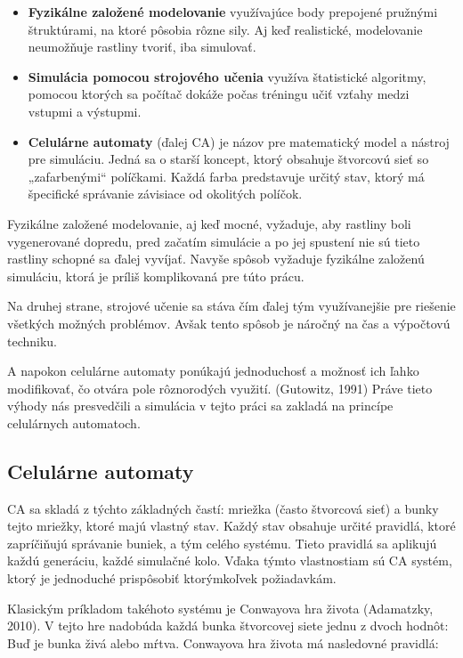 \documentclass[12pt]{article}
\begin{document}
\begin{itemize}
	\item \textbf{Fyzikálne založené modelovanie} využívajúce body prepojené
	      pružnými štruktúrami, na ktoré pôsobia rôzne sily. Aj keď realistické,
	      modelovanie neumožňuje rastliny tvoriť, iba simulovať.
	\item \textbf{Simulácia pomocou strojového učenia}
	      využíva štatistické
	      algoritmy, pomocou ktorých sa počítač dokáže počas tréningu učiť vzťahy medzi
	      vstupmi a výstupmi.
	\item \textbf{Celulárne automaty} (ďalej CA)
	      je názov pre matematický model a nástroj pre simuláciu. Jedná sa
	      o starší koncept, ktorý obsahuje štvorcovú sieť so „zafarbenými“
	      políčkami. Každá farba predstavuje určitý stav, ktorý má špecifické správanie
	      závisiace od okolitých políčok.
\end{itemize}

Fyzikálne založené modelovanie, aj keď mocné, vyžaduje, aby rastliny boli
vygenerované dopredu, pred začatím simulácie a po jej spustení nie sú tieto
rastliny schopné sa ďalej vyvíjať. Navyše spôsob vyžaduje fyzikálne založenú
simuláciu, ktorá je príliš komplikovaná pre túto prácu.

Na druhej strane, strojové učenie sa stáva čím ďalej tým využívanejšie pre
riešenie všetkých možných problémov. Avšak tento spôsob je náročný na čas
a výpočtovú techniku.

A napokon celulárne automaty ponúkajú jednoduchosť a možnosť ich ľahko
modifikovať, čo otvára pole rôznorodých využití. (Gutowitz, 1991)
Práve tieto výhody nás presvedčili a simulácia
v tejto práci sa zakladá na princípe celulárnych automatoch.

\subsection{Celulárne automaty}

CA sa skladá z týchto základných častí: mriežka (často štvorcová sieť)
a bunky tejto mriežky, ktoré majú vlastný stav. Každý stav obsahuje
určité pravidlá, ktoré zapríčiňujú správanie buniek, a tým celého systému.
Tieto pravidlá sa aplikujú každú generáciu, každé simulačné kolo.
Vďaka týmto vlastnostiam sú CA systém, ktorý je jednoduché prispôsobiť ktorýmkoľvek
požiadavkám.

Klasickým príkladom takéhoto systému je Conwayova hra života (Adamatzky, 2010).
V tejto hre nadobúda každá bunka štvorcovej siete jednu z dvoch hodnôt:
Buď je bunka živá alebo mŕtva. Conwayova hra života má nasledovné pravidlá:
\end{document}
